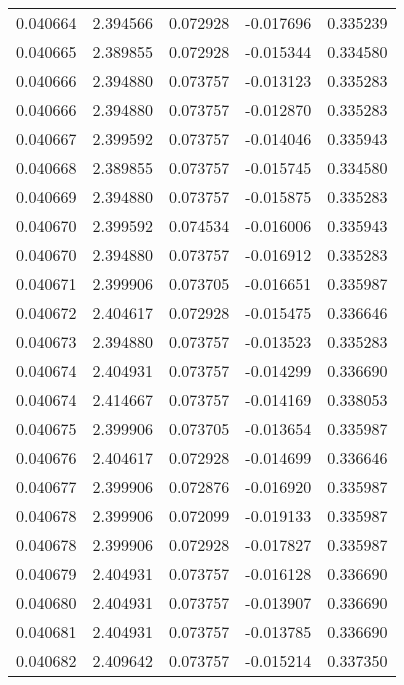 \begin{tabular}{lrrrr}
0.040664    &  2.394566 &  0.072928 & -0.017696 &             0.335239 \\
0.040665    &  2.389855 &  0.072928 & -0.015344 &             0.334580 \\
0.040666    &  2.394880 &  0.073757 & -0.013123 &             0.335283 \\
0.040666    &  2.394880 &  0.073757 & -0.012870 &             0.335283 \\
0.040667    &  2.399592 &  0.073757 & -0.014046 &             0.335943 \\
0.040668    &  2.389855 &  0.073757 & -0.015745 &             0.334580 \\
0.040669    &  2.394880 &  0.073757 & -0.015875 &             0.335283 \\
0.040670    &  2.399592 &  0.074534 & -0.016006 &             0.335943 \\
0.040670    &  2.394880 &  0.073757 & -0.016912 &             0.335283 \\
0.040671    &  2.399906 &  0.073705 & -0.016651 &             0.335987 \\
0.040672    &  2.404617 &  0.072928 & -0.015475 &             0.336646 \\
0.040673    &  2.394880 &  0.073757 & -0.013523 &             0.335283 \\
0.040674    &  2.404931 &  0.073757 & -0.014299 &             0.336690 \\
0.040674    &  2.414667 &  0.073757 & -0.014169 &             0.338053 \\
0.040675    &  2.399906 &  0.073705 & -0.013654 &             0.335987 \\
0.040676    &  2.404617 &  0.072928 & -0.014699 &             0.336646 \\
0.040677    &  2.399906 &  0.072876 & -0.016920 &             0.335987 \\
0.040678    &  2.399906 &  0.072099 & -0.019133 &             0.335987 \\
0.040678    &  2.399906 &  0.072928 & -0.017827 &             0.335987 \\
0.040679    &  2.404931 &  0.073757 & -0.016128 &             0.336690 \\
0.040680    &  2.404931 &  0.073757 & -0.013907 &             0.336690 \\
0.040681    &  2.404931 &  0.073757 & -0.013785 &             0.336690 \\
0.040682    &  2.409642 &  0.073757 & -0.015214 &             0.337350 \\

\end{tabular}
